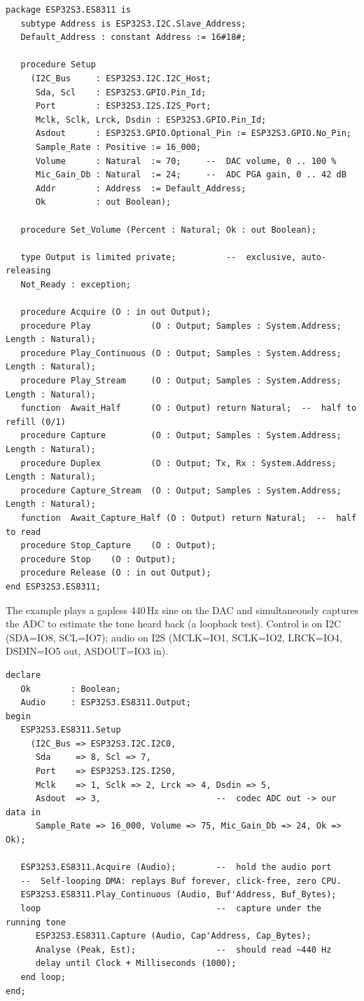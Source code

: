 \begin{lstlisting}
package ESP32S3.ES8311 is
   subtype Address is ESP32S3.I2C.Slave_Address;
   Default_Address : constant Address := 16#18#;

   procedure Setup
     (I2C_Bus     : ESP32S3.I2C.I2C_Host;
      Sda, Scl    : ESP32S3.GPIO.Pin_Id;
      Port        : ESP32S3.I2S.I2S_Port;
      Mclk, Sclk, Lrck, Dsdin : ESP32S3.GPIO.Pin_Id;
      Asdout      : ESP32S3.GPIO.Optional_Pin := ESP32S3.GPIO.No_Pin;
      Sample_Rate : Positive := 16_000;
      Volume      : Natural  := 70;     --  DAC volume, 0 .. 100 %
      Mic_Gain_Db : Natural  := 24;     --  ADC PGA gain, 0 .. 42 dB
      Addr        : Address  := Default_Address;
      Ok          : out Boolean);

   procedure Set_Volume (Percent : Natural; Ok : out Boolean);

   type Output is limited private;          --  exclusive, auto-releasing
   Not_Ready : exception;

   procedure Acquire (O : in out Output);
   procedure Play            (O : Output; Samples : System.Address; Length : Natural);
   procedure Play_Continuous (O : Output; Samples : System.Address; Length : Natural);
   procedure Play_Stream     (O : Output; Samples : System.Address; Length : Natural);
   function  Await_Half      (O : Output) return Natural;  --  half to refill (0/1)
   procedure Capture         (O : Output; Samples : System.Address; Length : Natural);
   procedure Duplex          (O : Output; Tx, Rx : System.Address; Length : Natural);
   procedure Capture_Stream  (O : Output; Samples : System.Address; Length : Natural);
   function  Await_Capture_Half (O : Output) return Natural;  --  half to read
   procedure Stop_Capture    (O : Output);
   procedure Stop    (O : Output);
   procedure Release (O : in out Output);
end ESP32S3.ES8311;
\end{lstlisting}

The example plays a gapless 440\,Hz sine on the DAC and simultaneously captures the
ADC to estimate the tone heard back (a loopback test). Control is on I2C (SDA=IO8,
SCL=IO7); audio on I2S (MCLK=IO1, SCLK=IO2, LRCK=IO4, DSDIN=IO5 out, ASDOUT=IO3 in).

\begin{lstlisting}
declare
   Ok        : Boolean;
   Audio     : ESP32S3.ES8311.Output;
begin
   ESP32S3.ES8311.Setup
     (I2C_Bus => ESP32S3.I2C.I2C0,
      Sda     => 8, Scl => 7,
      Port    => ESP32S3.I2S.I2S0,
      Mclk    => 1, Sclk => 2, Lrck => 4, Dsdin => 5,
      Asdout  => 3,                       --  codec ADC out -> our data in
      Sample_Rate => 16_000, Volume => 75, Mic_Gain_Db => 24, Ok => Ok);

   ESP32S3.ES8311.Acquire (Audio);        --  hold the audio port
   --  Self-looping DMA: replays Buf forever, click-free, zero CPU.
   ESP32S3.ES8311.Play_Continuous (Audio, Buf'Address, Buf_Bytes);
   loop                                   --  capture under the running tone
      ESP32S3.ES8311.Capture (Audio, Cap'Address, Cap_Bytes);
      Analyse (Peak, Est);                --  should read ~440 Hz
      delay until Clock + Milliseconds (1000);
   end loop;
end;
\end{lstlisting}

